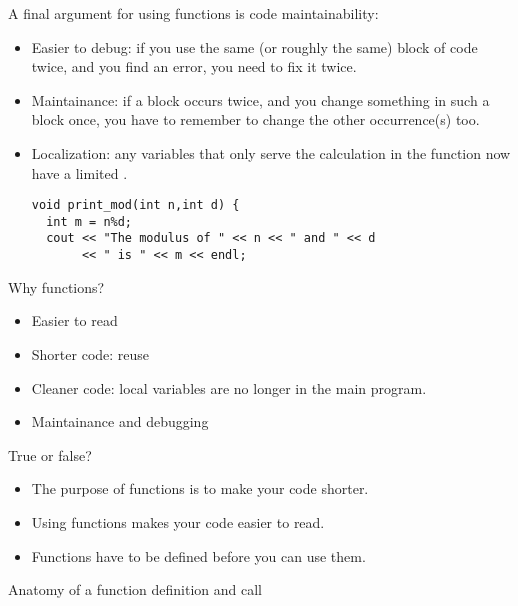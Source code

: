 A final argument for using functions is code maintainability:
\begin{itemize}
\item Easier to debug: if you use the same (or roughly the same) block
  of code twice, and you find an error, you need to fix it twice.
\item Maintainance: if a block occurs twice, and  you change something in such a block
  once, you have to remember to change the other occurrence(s) too.
\item Localization: any variables that only serve the calculation in
  the function now have a limited .
\begin{lstlisting}
void print_mod(int n,int d) {
  int m = n%d;
  cout << "The modulus of " << n << " and " << d 
       << " is " << m << endl;
\end{lstlisting}
\end{itemize}

\begin{slide}{Why functions?}
  \label{sl:func-why}
  \begin{itemize}
  \item Easier to read
  \item Shorter code: reuse
  \item Cleaner code: local variables are no longer in the main program.
  \item Maintainance and debugging
  \end{itemize}
\end{slide}

\begin{review}
  \label{rev:func-why}
  True or false?
  \begin{itemize}
  \item The purpose of functions is to make your code shorter.
  \item Using functions makes your code easier to read.
  \item Functions have to be defined before you can use them.
  \end{itemize}
\end{review}

 {Anatomy of a function definition and call}

